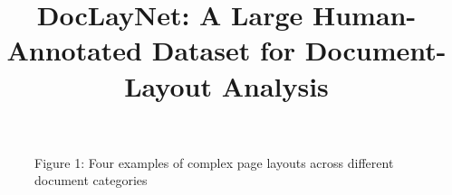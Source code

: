 \documentclass[11pt,a4paper]{article}
\title{DocLayNet: A Large Human-Annotated Dataset for Document-Layout Analysis}
\begin{document}
\maketitle

\begin{figure}[h]
\caption{Figure 1: Four examples of complex page layouts across different document categories}
\end{figure}

\end{document}
